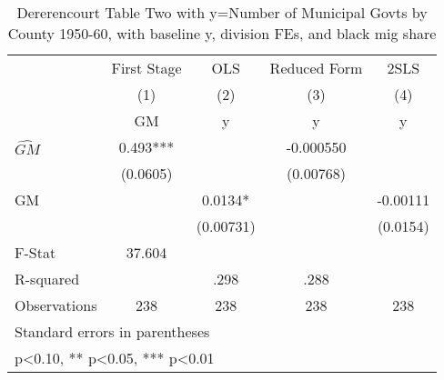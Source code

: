 \begin{table}[htbp]\centering
\def\sym#1{\ifmmode^{#1}\else\(^{#1}\)\fi}
\caption{Dererencourt Table Two with y=Number of Municipal Govts by County 1950-60, with baseline y, division FEs, and black mig share}
\begin{tabular}{l*{4}{c}}
\toprule
                    & First Stage   &         OLS   &Reduced Form   &        2SLS   \\
                    &\multicolumn{1}{c}{(1)}&\multicolumn{1}{c}{(2)}&\multicolumn{1}{c}{(3)}&\multicolumn{1}{c}{(4)}\\
                    &\multicolumn{1}{c}{GM}&\multicolumn{1}{c}{y}&\multicolumn{1}{c}{y}&\multicolumn{1}{c}{y}\\
\midrule
$\hat{GM}$          &       0.493***&               &   -0.000550   &               \\
                    &    (0.0605)   &               &   (0.00768)   &               \\
\addlinespace
GM                  &               &      0.0134*  &               &    -0.00111   \\
                    &               &   (0.00731)   &               &    (0.0154)   \\
\midrule
F-Stat              &      37.604   &               &               &               \\
R-squared           &               &        .298   &        .288   &               \\
Observations        &         238   &         238   &         238   &         238   \\
\bottomrule
\multicolumn{5}{l}{\footnotesize Standard errors in parentheses}\\
\multicolumn{5}{l}{\footnotesize * p<0.10, ** p<0.05, *** p<0.01}\\
\end{tabular}
\end{table}
